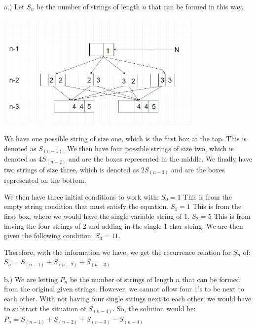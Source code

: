 \documentclass{article}
\begin{document}
\smallskip
\begin{solution}
\newline
a.) Let $S_n$ be the number of strings of length $n$ that can be formed in this way.

\begin{center}
\includegraphics[width=4in]{diagram.PNG}
\newline
\end{center}

We have one possible string of size one, which is the first box at the top. This is denoted as $S_{(n-1)}$. We then have four possible strings of size two, which is denoted as 4$S_{(n-2)}$ and are the boxes represented in the middle. We finally have two strings of size three, which is denoted as $2S_{(n-3)}$ and are the boxes represented on the bottom.

We then have three initial conditions to work with:
\newline
$S_0 = 1$
This is from the empty string condition that must satisfy the equation.
\newline
$S_1 = 1$
This is from the first box, where we would have the single variable string of 1.
\newline
$S_2 = 5$
This is from having the four strings of 2 and adding in the single 1 char string.
\newline
We are then given the following condition:
\newline
$S_3 = 11$.

Therefore, with the information we have, we get the recurrence relation for $S_n$ of:
\newline
$S_n=S_{(n-1)} + S_{(n-2)} + S_{(n-3)}$
\newline

b.) We are letting $P_n$ be the number of strings of length $n$ that can be formed from the original given strings. However, we cannot allow four 1's to be next to each other. With not having four single strings next to each other, we would have to subtract the situation of $S_{(n-4)}$. So, the solution would be:
\newline
$P_n=S_{(n-1)} + S_{(n-2)} + S_{(n-3)}-S_{(n-4)}$




\end{solution}
\end{document}
